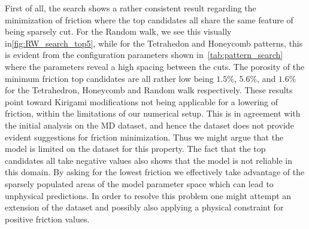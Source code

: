 First of all, the search shows a rather consistent result regarding the minimization of friction where the top candidates all share the same feature of being sparsely cut. For the Random walk, we see this visually in\cref{fig:RW_search_top5}, while for the Tetrahedon and Honeycomb patterns, this is evident from the configuration parameters shown in~\cref{tab:pattern_search} where the parameters reveal a high spacing between the
cuts. The porosity of the minimum friction top candidates are all rather low being $1.5\%$, $5.6\%$, and $1.6\%$ for the Tetrahedron, Honeycomb and Random walk respectively. These results point toward Kirigami modifications not being applicable for a lowering of friction, within the limitations of our numerical setup. This is in agreement with the initial analysis on the \acrshort{MD} dataset, and hence the dataset does not provide evident suggestions for friction minimization. Thus we might argue that the model is limited on the dataset for this property. The fact that the top candidates all take
negative values also shows that the model is not reliable in this domain. By
asking for the lowest friction we effectively take advantage of the sparsely populated areas of the model parameter space which can lead to unphysical predictions. In order to resolve this problem one might attempt an extension of the dataset and possibly also applying a physical constraint for positive friction values. 


